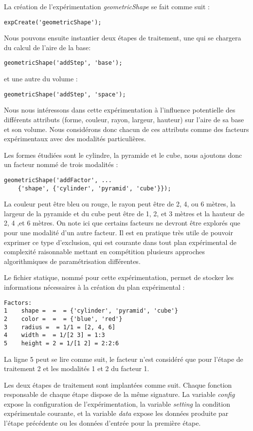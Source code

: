 La création de l'expérimentation \textsl{geometricShape} se fait comme suit :
\begin{lstlisting}
expCreate('geometricShape');
\end{lstlisting}
Nous pouvons ensuite instantier deux étapes de traitement, une qui se chargera du calcul de l'aire de la base:
\begin{lstlisting}
geometricShape('addStep', 'base');
\end{lstlisting}
et une autre du volume :
\begin{lstlisting}
geometricShape('addStep', 'space');
\end{lstlisting}
Nous nous intéressons dans cette expérimentation à l'influence potentielle des différents attributs (forme, couleur, rayon, largeur, hauteur) sur l'aire de sa base et son volume. Nous considérons donc chacun de ces attributs comme des facteurs expérimentaux avec des modalités particulières.

Les formes étudiées sont le cylindre, la pyramide et le cube, nous ajoutons donc un facteur nommé  de trois modalités :
\begin{lstlisting}
geometricShape('addFactor', ...
	{'shape', {'cylinder', 'pyramid', 'cube'}});
\end{lstlisting}
La couleur peut être bleu ou rouge, le rayon peut être de 2, 4, ou 6 mètres, la largeur de la pyramide et du cube peut être de 1, 2, et 3 mètres et la hauteur de 2, 4 ,et 6 mètres. On note ici que certains facteurs ne devront être explorés que pour une modalité d'un autre facteur. Il est en pratique très utile de pouvoir exprimer ce type d'exclusion, qui est courante dans tout plan expérimental de complexité raisonnable mettant en compétition plusieurs approches algorithmiques de paramétrisation différentes.

Le fichier statique, nommé  pour cette expérimentation, permet de stocker les informations nécessaires à la création du plan expérimental :
\begin{lstlisting}
Factors:
1    shape =  =  = {'cylinder', 'pyramid', 'cube'}
2    color =  =  = {'blue', 'red'}
3    radius =  = 1/1 = [2, 4, 6]
4    width =  = 1/[2 3] = 1:3
5    height = 2 = 1/[1 2] = 2:2:6
\end{lstlisting}
La ligne 5 peut se lire comme suit, le facteur  n'est considéré que pour l'étape de traitement 2 et les modalités 1 et 2 du facteur 1.

Les deux étapes de traitement sont implantées comme suit. Chaque fonction responsable de chaque étape dispose de la même signature. La variable \textsl{config} expose la configuration de l'expérimentation, la variable \textsl{setting} la condition expérimentale courante, et la variable \textsl{data} expose les données produite par l'étape précédente ou les données d'entrée pour la première étape.

